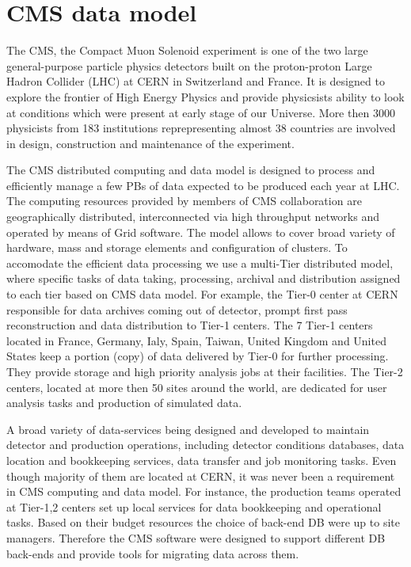 \documentclass[a4paper]{jpconf}
\begin{document}
\section{CMS data model\label{DataModel}}
The CMS, the Compact Muon Solenoid experiment \cite{CMS} 
is one of the two large general-purpose particle physics detectors built on 
the proton-proton Large Hadron Collider (LHC) at CERN in Switzerland and France. 
It is designed to explore the frontier of High Energy Physics and provide physicsists
ability to look at conditions which were present at early stage of our Universe.
More then 3000 physicists from 183 institutions reprepresenting almost 
38 countries are involved in design, construction and maintenance of the experiment.

The CMS distributed computing and data model \cite{CMSDataModel} 
is designed to process
and efficiently manage a few PBs of data expected to be produced each year
at LHC. The computing resources provided by members of CMS
collaboration are geographically distributed, 
interconnected via high throughput networks and operated by means 
of Grid software. The model allows to cover broad variety of
hardware, mass and storage elements and configuration of
clusters. To accomodate the efficient data processing we use 
a multi-Tier distributed model, where specific tasks of data taking,
processing, archival and distribution assigned to each tier based
on CMS data model. For example, the Tier-0 center at CERN responsible
for data archives coming out of detector, prompt first pass reconstruction
and data distribution to Tier-1 centers. The 7 Tier-1 centers
located in France, Germany, Ialy, Spain, Taiwan, United Kingdom and United States
keep a portion (copy) of data delivered by Tier-0 for further processing.
They provide storage and high priority analysis jobs at their facilities.
The Tier-2 centers, located at more then 50 sites around the world,
are dedicated for user analysis tasks and production of simulated data.

A broad variety of data-services being designed and developed to
maintain detector and production operations, including detector
conditions databases, data location and bookkeeping services,
data transfer and job monitoring tasks. Even though majority of them
are located at CERN, it was never been a requirement in CMS computing
and data model. For instance, the production teams operated at Tier-1,2
centers set up local services for data bookkeeping and operational
tasks. Based on their budget resources the choice of back-end DB were
up to site managers. Therefore the CMS software were designed to support different
DB back-ends and provide tools for migrating data across them.
\end{document}
